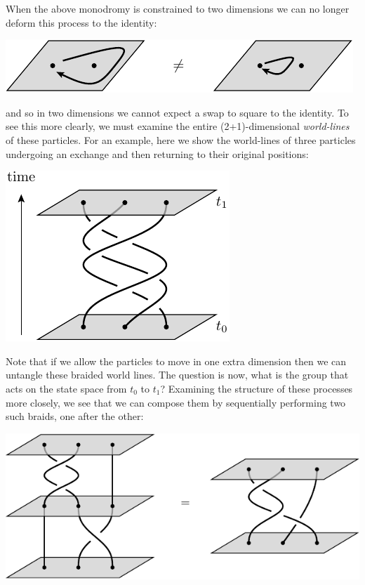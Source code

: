 \documentclass[aps, tightenlines, letterpaper, onecolumn, superscriptaddress, notitlepage, 11pt, groupedaddress]{revtex4-1}
\begin{document}
When the above monodromy is constrained to two dimensions
we can no longer deform this process to the identity:
\begin{center}
\includegraphics[]{pic-monodromy2d.pdf}
\end{center}
and so in two dimensions we cannot expect a swap to square to the identity.
To see this more clearly,
we must examine the entire (2+1)-dimensional \emph{world-lines} of these particles.
For an example, here we show the world-lines of three particles undergoing an exchange and then
returning to their original positions:
\begin{center}
\includegraphics[]{pic-braid-worldlines.pdf}
\end{center}
Note that if we allow the particles to move in one extra
dimension then we can untangle these braided world lines.
The question is now, what is the group that acts on the
state space from $t_0$ to $t_1$?
Examining the structure of these processes more closely,
we see that we can compose them by sequentially performing
two such braids, one after the other:
\begin{center}
\includegraphics[]{pic-braid-compose.pdf}
\end{center}
\end{document}
